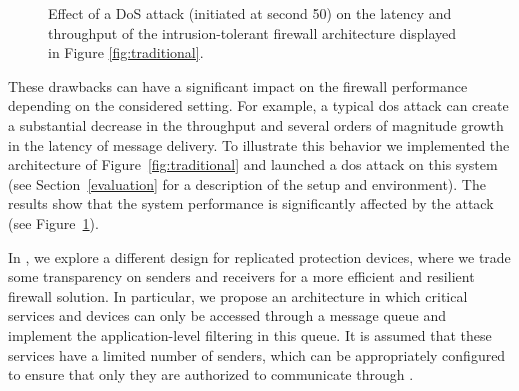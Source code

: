 \begin{figure}[t]
\begin{center}
\hspace{-5mm}
\caption{Effect of a DoS attack (initiated at second 50) on the latency and throughput of the intrusion-tolerant firewall architecture displayed in Figure \ref{fig:traditional}.}
\label{fig:attack_traditional}
\end{center}
\end{figure}

These drawbacks can have a significant impact on the firewall performance depending on the considered setting. 
For example, a typical \gls{dos} attack can create a substantial decrease in the throughput and several orders of magnitude growth in the latency of message delivery. 
To illustrate this behavior we implemented the architecture of Figure~\ref{fig:traditional} and launched a \gls{dos} attack on this system (see Section~\ref{evaluation} for a description of the setup and environment). 
The results show that the system performance is significantly affected by the attack (see Figure~\ref{fig:attack_traditional}).




In \sieveq, we explore a different design for replicated protection devices, where we trade some transparency on senders and receivers for a more efficient and resilient firewall solution.
In particular, we propose an architecture in which critical services and devices can only be accessed through a message queue and implement the application-level filtering in this queue.
It is assumed that these services have a limited number of senders, which can be appropriately configured to ensure that only they are authorized to communicate through \sieveq.

